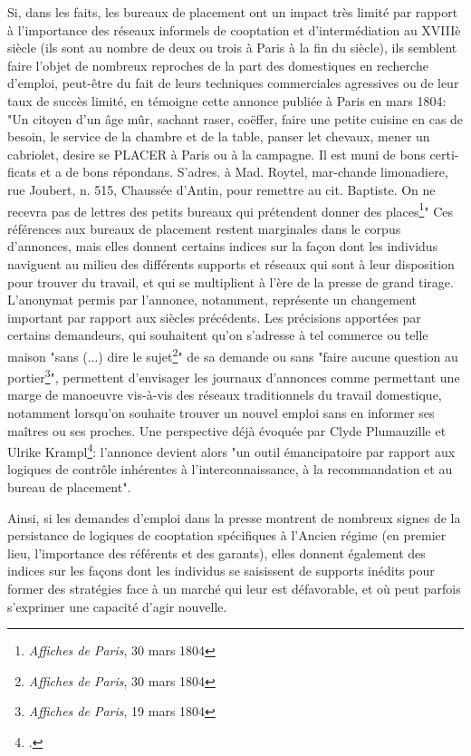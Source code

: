 Si, dans les faits, les bureaux de placement ont un impact très limité par rapport à l'importance des réseaux informels de cooptation et d'intermédiation au XVIIIè siècle (ils sont au nombre de deux ou trois à Paris à la fin du siècle), ils semblent faire l'objet de nombreux reproches de la part des domestiques en recherche d'emploi, peut-être du fait de leurs techniques commerciales agressives ou de leur taux de succès limité, en témoigne cette annonce publiée à Paris en mars 1804: "Un citoyen d'un âge mûr, sachant raser, coëffer, faire une petite cuisine en cas de besoin, le service de la chambre et de la table, panser let chevaux, mener un cabriolet, desire se PLACER à Paris ou à la campagne. Il est muni de bons certi-ficats et a de bons répondans. S'adres. à Mad. Roytel, mar-chande limonadiere, rue Joubert, n. 515, Chaussée d'Antin, pour remettre au cit. Baptiste. On ne recevra pas de lettres des petits bureaux qui prétendent donner des places\footnote{\textit{Affiches de Paris}, 30 mars 1804}"
Ces références aux bureaux de placement restent marginales dans le corpus d'annonces, mais elles donnent certains indices sur la façon dont les individus naviguent au milieu des différents supports et réseaux qui sont à leur disposition pour trouver du travail, et qui se multiplient à l'ère de la presse de grand tirage. L'anonymat permis par l'annonce, notamment, représente un changement important par rapport aux siècles précédents. Les précisions apportées par certains demandeurs, qui souhaitent qu'on s'adresse à tel commerce ou telle maison "sans (...) dire le sujet\footnote{\textit{Affiches de Paris}, 30 mars 1804}" de sa demande ou sans "faire aucune question au portier\footnote{\textit{Affiches de Paris}, 19 mars 1804}", permettent d'envisager les journaux d'annonces comme permettant une marge de manoeuvre vis-à-vis des réseaux traditionnels du travail domestique, notamment lorsqu'on souhaite trouver un nouvel emploi sans en informer ses maîtres ou ses proches. Une perspective déjà évoquée par Clyde Plumauzille et Ulrike Krampl\footcites{kramplPresseAnnoncesParisienne2020}: l'annonce devient alors "un outil émancipatoire par rapport aux logiques de contrôle inhérentes à l’interconnaissance, à la recommandation et au bureau de placement". 

\bigskip

Ainsi, si les demandes d'emploi dans la presse montrent de nombreux signes de la persistance de logiques de cooptation spécifiques à l'Ancien régime (en premier lieu, l'importance des référents et des garants), elles donnent également des indices sur les façons dont les individus se saisissent de supports inédits pour former des stratégies face à un marché qui leur est défavorable, et où peut parfois s'exprimer une capacité d'agir nouvelle.
